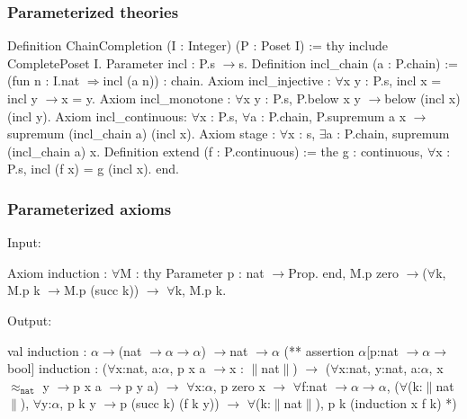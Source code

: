 \documentclass[compress,t]{beamer}
\newcommand{\iTo}{{\ensuremath{\to}}}
\newcommand{\iForall}{$\forall$}
\newcommand{\iImply}{$\Rightarrow$}
\newcommand{\iExists}{$\exists$}
\newcommand{\iT}[1]{$\|$#1$\|$}
\newcommand{\iPer}[1]{$\approx_{\mathtt{#1}}$}
\newcommand{\iAlpha}{$\alpha$}
\begin{document}
\begin{frame}[fragile]
  \frametitle{Parameterized theories}

\begin{sourcex}
Definition ChainCompletion
  (I : Integer)
  (P : Poset I) :=
thy
  include CompletePoset I.
  Parameter incl : P.s \iTo s.
  Definition incl_chain (a : P.chain) :=
    (fun n : I.nat \iImply incl (a n)) : chain.
  Axiom incl_injective :
    \iForall x y : P.s, incl x = incl y \iTo x = y.
  Axiom incl_monotone :
    \iForall x y : P.s, P.below x y \iTo below (incl x) (incl y).
  Axiom incl_continuous:
    \iForall x : P.s, \iForall a : P.chain,
      P.supremum a x \iTo supremum (incl_chain a) (incl x).
  Axiom stage :
    \iForall x : s, \iExists a : P.chain, supremum (incl_chain a) x.
  Definition extend (f : P.continuous) :=
    the g : continuous, \iForall x : P.s, incl (f x) = g (incl x).
end. 
\end{sourcex}
\end{frame}

\begin{frame}[fragile]
  \frametitle{Parameterized axioms}

  Input:
\begin{source}
Axiom induction :
  \iForall M : thy Parameter p : nat \iTo Prop. end,
  M.p zero \iTo (\iForall k, M.p k \iTo M.p (succ k)) \iTo
  \iForall k, M.p k.    
\end{source}

Output:
%
\begin{sourcex}
val induction : \iAlpha \iTo (nat \iTo \iAlpha \iTo \iAlpha) \iTo nat \iTo \iAlpha
(**  assertion \iAlpha [p:nat \iTo \iAlpha \iTo bool] induction : 
  (\iForall x:nat, a:\iAlpha,  p x a \iTo x : \iT{nat}) \iTo
  (\iForall x:nat, y:nat, a:\iAlpha,  x \iPer{nat} y \iTo p x a \iTo p y a) \iTo
  \iForall x:\iAlpha,  p zero x \iTo
  \iForall f:nat \iTo \iAlpha \iTo \iAlpha,
  (\iForall (k:\iT{nat}), \iForall y:\iAlpha,  p k y \iTo p (succ k) (f k y)) \iTo
  \iForall (k:\iT{nat}),  p k (induction x f k)
*)
\end{sourcex}

\end{frame}
\end{document}
